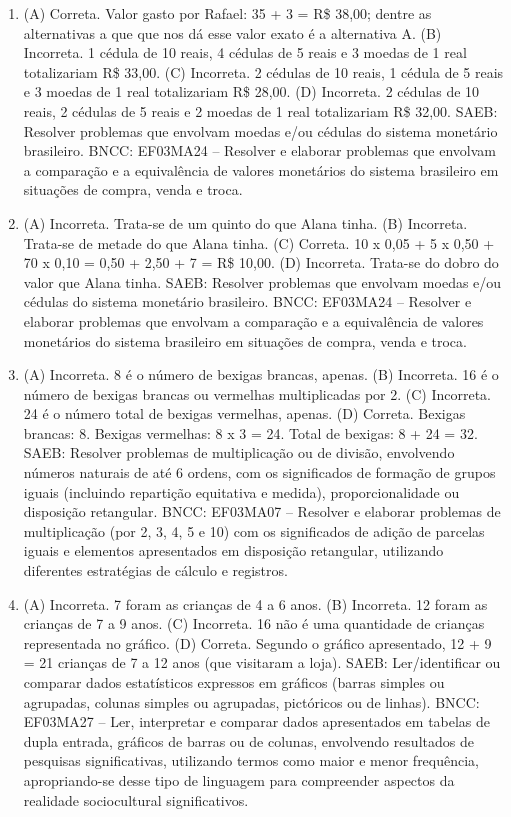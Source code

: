 \begin{enumerate}
\item
(A) Correta. Valor gasto por Rafael: 35 + 3 = R\$ 38,00; dentre as alternativas a que que nos dá esse valor exato é a alternativa A.
(B) Incorreta. 1 cédula de 10 reais, 4 cédulas de 5 reais e 3 moedas de 1 real totalizariam R\$ 33,00.
(C) Incorreta. 2 cédulas de 10 reais, 1 cédula de 5 reais e 3 moedas de 1 real totalizariam R\$ 28,00.
(D) Incorreta. 2 cédulas de 10 reais, 2 cédulas de 5 reais e 2 moedas de 1 real totalizariam R\$ 32,00.
SAEB: Resolver problemas que envolvam moedas e/ou cédulas do sistema monetário brasileiro.
BNCC: EF03MA24 -- Resolver e elaborar problemas que envolvam a comparação e a equivalência de
valores monetários do sistema brasileiro em situações de compra, venda e troca.

\item
(A) Incorreta. Trata-se de um quinto do que Alana tinha.
(B) Incorreta. Trata-se de metade do que Alana tinha.
(C) Correta. 10 x 0,05 + 5 x 0,50 + 70 x 0,10 = 0,50 + 2,50 + 7 = R\$ 10,00.
(D) Incorreta. Trata-se do dobro do valor que Alana tinha.
SAEB: Resolver problemas que envolvam moedas e/ou cédulas do sistema monetário brasileiro.
BNCC: EF03MA24 -- Resolver e elaborar problemas que envolvam a comparação e a equivalência de
valores monetários do sistema brasileiro em situações de compra, venda e troca.

\item
(A) Incorreta. 8 é o número de bexigas brancas, apenas.
(B) Incorreta. 16 é o número de bexigas brancas ou vermelhas multiplicadas por 2.
(C) Incorreta. 24 é o número total de bexigas vermelhas, apenas.
(D) Correta. Bexigas brancas: 8. Bexigas vermelhas: 8 x 3 = 24. Total de bexigas: 8 + 24 = 32.
SAEB: Resolver problemas de multiplicação ou de divisão, envolvendo números naturais de até 6 ordens, com os significados de formação de grupos iguais (incluindo repartição equitativa e medida), proporcionalidade ou disposição retangular.
BNCC: EF03MA07 – Resolver e elaborar problemas de multiplicação (por 2, 3, 4, 5 e 10) com os significados de adição de parcelas iguais e elementos apresentados em disposição retangular, utilizando diferentes estratégias de cálculo e registros.

\item
(A) Incorreta. 7 foram as crianças de 4 a 6 anos.
(B) Incorreta. 12 foram as crianças de 7 a 9 anos.
(C) Incorreta. 16 não é uma quantidade de crianças representada no gráfico.
(D) Correta. Segundo o gráfico apresentado, 12 + 9 = 21 crianças de 7 a 12 anos (que visitaram a loja).
SAEB: Ler/identificar ou comparar dados estatísticos
expressos em gráficos (barras simples ou agrupadas, colunas simples ou agrupadas, pictóricos ou de linhas).
BNCC: EF03MA27 -- Ler, interpretar e comparar dados apresentados em tabelas de dupla entrada,
gráficos de barras ou de colunas, envolvendo resultados de pesquisas significativas, utilizando
termos como maior e menor frequência, apropriando-se desse tipo de linguagem para
compreender aspectos da realidade sociocultural significativos.


\end{enumerate}
